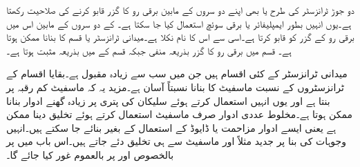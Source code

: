 
دو جوڑ ٹرانزسٹر کی طرح  یا    بھی اپنے دو سروں کے مابین برقی رو کا گزر قابو کرنے کی صلاحیت رکھتا ہے۔یوں انہیں بطور ایمپلیفائر یا برقی سوئچ استعمال کیا جا سکتا ہے۔ کے دو سروں کے مابین  اس میں برقی رو کے گزر کو قابو کرتا ہے۔اسی سے اس کا نام  نکلا ہے۔میدانی ٹرانزسٹر  یا  قسم کا بنانا ممکن ہوتا ہے۔ قسم  میں برقی  رو کا گزر بذریعہ منفی  جبکہ  قسم کے  میں بذریعہ مثبت  ہوتا ہے۔

میدانی ٹرانزسٹر کے کئی اقسام ہیں جن میں    سب سے زیادہ مقبول ہے۔بقایا اقسام کے ٹرانزسٹروں کے نسبت ماسفیٹ کا بنانا نسبتاً آسان ہے۔مزید یہ کہ ماسفیٹ کم رقبہ پر بنتا ہے اور یوں انہیں استعمال کرتے ہوئے سلیکان کی پتری  پر زیادہ گھنے ادوار بنانا ممکن ہوتا ہے۔مخلوط عددی ادوار صرف ماسفیٹ استعمال کرتے ہوئے تخلیق دینا ممکن ہے یعنی ایسے ادوار مزاحمت یا ڈایوڈ کے استعمال کے بغیر بنائے جا سکتے ہیں۔انہیں وجوہات کی بنا پر جدید  مثلاً   اور   ماسفیٹ سے ہی تخلیق دئے جاتے ہیں۔اس باب میں   پر بالخصوص اور   پر بالعموم غور کیا جائے گا۔


